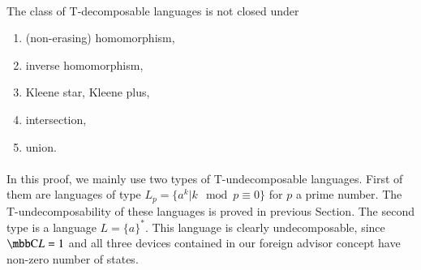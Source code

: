 \paragraph{}
\cveta The class of T-decomposable languages is not closed under 
\begin{enumerate}
\item (non-erasing) homomorphism,
\item inverse homomorphism,
\item Kleene star, Kleene plus,
\item intersection,
\item union.
\end{enumerate}

\paragraph{}
\dokaz In this proof, we mainly use two types of T-undecomposable languages. First of them are languages of type $L_p = \{ a^k | k \mod p \equiv 0 \}$ for $p$ a prime number. The T-undecomposability of these languages is proved in previous Section. The second type is a language $L = \{ a \}^*$. This language is clearly undecomposable, since $\C{L} = 1$ and all three devices contained in our foreign advisor concept have non-zero number of states.

